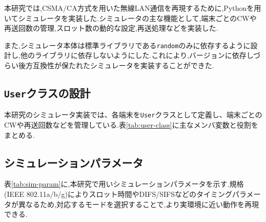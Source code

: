 \documentclass[a4paper, 10pt]{ltjsarticle}
\begin{document}
本研究では,CSMA/CA方式を用いた無線LAN通信を再現するために,Pythonを用いてシミュレータを実装した.シミュレータの主な機能として,端末ごとのCWや再送回数の管理,スロット数の動的な設定,再送処理などを実装した.

また,シミュレータ本体は標準ライブラリである\texttt{random}のみに依存するように設計し,他のライブラリに依存しないようにした.これにより,バージョンに依存しづらい後方互換性が保たれたシミュレータを実装することができた.


\subsection{\texttt{User}クラスの設計}
本研究のシミュレータ実装では、各端末を\texttt{User}クラスとして定義し、端末ごとのCWや再送回数などを管理している.表\ref{tab:user-class}に主なメンバ変数と役割をまとめる.


\subsection{シミュレーションパラメータ}
表\ref{tab:sim-param}に,本研究で用いシミュレーションパラメータを示す.規格(IEEE 802.11a/b/g)によりスロット時間やDIFS/SIFSなどのタイミングパラメータが異なるため,対応するモードを選択することで,より実環境に近い動作を再現できる.
\end{document}
